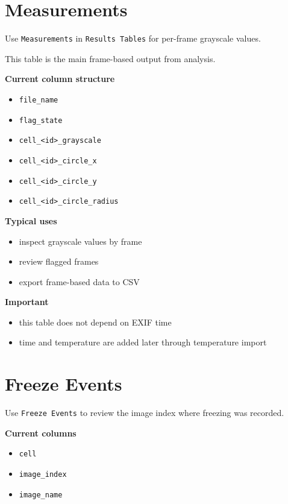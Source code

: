 \documentclass[
  9pt,
  letterpaper,
  oneside,
  open=any,
  DIV=15,
  parskip=half-,
  headings=big,
  numbers=noenddot
]{scrbook}
\newcommand{\manuallead}[1]{%
  \vspace{0.15em}%
  {\sffamily\bfseries\color{ManualBlue}#1}\par\nobreak\vspace{0.05em}%
}
\begin{document}
\section{Measurements}

Use \texttt{Measurements} in \texttt{Results Tables} for per-frame grayscale values.


This table is the main frame-based output from analysis.


\manuallead{Current column structure}

\begin{itemize}[leftmargin=*,itemsep=0.35em,topsep=0.4em]
\item \texttt{file\_name}
\item \texttt{flag\_state}
\item \texttt{cell\_<id>\_grayscale}
\item \texttt{cell\_<id>\_circle\_x}
\item \texttt{cell\_<id>\_circle\_y}
\item \texttt{cell\_<id>\_circle\_radius}
\end{itemize}

\manuallead{Typical uses}

\begin{itemize}[leftmargin=*,itemsep=0.35em,topsep=0.4em]
\item inspect grayscale values by frame
\item review flagged frames
\item export frame-based data to CSV
\end{itemize}

\manuallead{Important}

\begin{itemize}[leftmargin=*,itemsep=0.35em,topsep=0.4em]
\item this table does not depend on EXIF time
\item time and temperature are added later through temperature import
\end{itemize}

\section{Freeze Events}

Use \texttt{Freeze Events} to review the image index where freezing was recorded.


\manuallead{Current columns}

\begin{itemize}[leftmargin=*,itemsep=0.35em,topsep=0.4em]
\item \texttt{cell}
\item \texttt{image\_index}
\item \texttt{image\_name}
\end{itemize}
\end{document}
